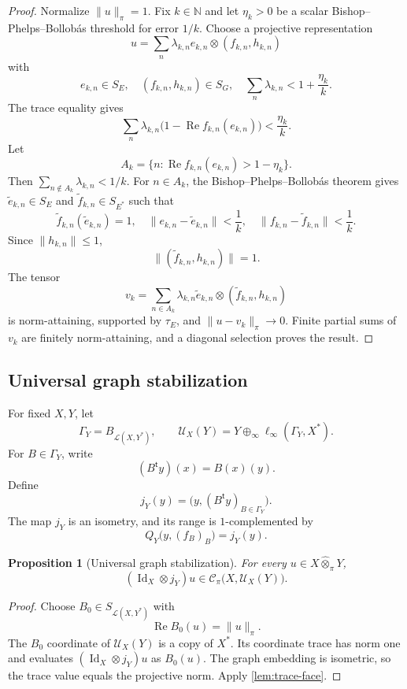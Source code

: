 \documentclass[11pt]{article}
\newtheorem{proposition}[theorem]{Proposition}
\theoremstyle{definition}
\theoremstyle{remark}
\newcommand{\N}{\mathbb N}
\newcommand{\whot}{\widehat\otimes_\pi}
\newcommand{\Lin}{\mathcal L}
\newcommand{\Rea}{\operatorname{Re}}
\newcommand{\Id}{\operatorname{Id}}
\newcommand{\Cpi}{\mathscr C_\pi}
\begin{document}
\begin{proof}
Normalize $\|u\|_\pi=1$.  Fix $k\in\N$ and let $\eta_k>0$ be a scalar Bishop--Phelps--Bollob\'as threshold for error $1/k$.  Choose a projective representation
\[
 u=\sum_n\lambda_{k,n}e_{k,n}\otimes(f_{k,n},h_{k,n})
\]
with
\[
 e_{k,n}\in S_E,
 \quad
 (f_{k,n},h_{k,n})\in S_G,
 \quad
 \sum_n\lambda_{k,n}<1+\frac{\eta_k}{k}.
\]
The trace equality gives
\[
 \sum_n\lambda_{k,n}
 \bigl(1-\Rea f_{k,n}(e_{k,n})\bigr)
 <\frac{\eta_k}{k}.
\]
Let
\[
 A_k=\{n:\Rea f_{k,n}(e_{k,n})>1-\eta_k\}.
\]
Then $\sum_{n\notin A_k}\lambda_{k,n}<1/k$.  For $n\in A_k$, the Bishop--Phelps--Bollob\'as theorem gives $\widetilde e_{k,n}\in S_E$ and $\widetilde f_{k,n}\in S_{E^*}$ such that
\[
 \widetilde f_{k,n}(\widetilde e_{k,n})=1,
 \quad
 \|e_{k,n}-\widetilde e_{k,n}\|<\frac1k,
 \quad
 \|f_{k,n}-\widetilde f_{k,n}\|<\frac1k.
\]
Since $\|h_{k,n}\|\leq1$,
\[
 \|(\widetilde f_{k,n},h_{k,n})\|=1.
\]
The tensor
\[
 v_k=\sum_{n\in A_k}\lambda_{k,n}
 \widetilde e_{k,n}\otimes(\widetilde f_{k,n},h_{k,n})
\]
is norm-attaining, supported by $\tau_E$, and $\|u-v_k\|_\pi\to0$.  Finite partial sums of $v_k$ are finitely norm-attaining, and a diagonal selection proves the result.
\end{proof}

\subsection{Universal graph stabilization}

For fixed $X,Y$, let
\[
 \Gamma_Y=B_{\Lin(X,Y^*)},
 \qquad
 \mathcal U_X(Y)=Y\oplus_\infty\ell_\infty(\Gamma_Y,X^*).
\]
For $B\in\Gamma_Y$, write
\[
 (B^{\mathsf t}y)(x)=B(x)(y).
\]
Define
\[
 j_Y(y)=\bigl(y,(B^{\mathsf t}y)_{B\in\Gamma_Y}\bigr).
\]
The map $j_Y$ is an isometry, and its range is $1$-complemented by
\[
 Q_Y\bigl(y,(f_B)_B\bigr)=j_Y(y).
\]

\begin{proposition}[Universal graph stabilization]\label{prop:graph}
For every $u\in X\whot Y$,
\[
 (\Id_X\otimes j_Y)u\in\Cpi\bigl(X,\mathcal U_X(Y)\bigr).
\]
\end{proposition}

\begin{proof}
Choose $B_0\in S_{\Lin(X,Y^*)}$ with
\[
 \Rea B_0(u)=\|u\|_\pi.
\]
The $B_0$ coordinate of $\mathcal U_X(Y)$ is a copy of $X^*$.  Its coordinate trace has norm one and evaluates $(\Id_X\otimes j_Y)u$ as $B_0(u)$.  The graph embedding is isometric, so the trace value equals the projective norm.  Apply \cref{lem:trace-face}.
\end{proof}
\end{document}
